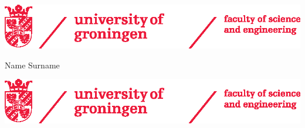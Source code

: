 
\thispagestyle{empty}

\noindent
\includegraphics[width=1\textwidth]{figs/rugr_fse_logoen_rood_cmyk.eps}

\begin{center}

\vspace{6cm}%

{\fontsize{29pt}{34.8pt}\selectfont \textbf{\theprojecttitle}}


\vspace{9cm}%

{\Large Name Surname}

\end{center}

\clearpage


\thispagestyle{empty}

\noindent
\includegraphics[width=1\textwidth]{figs/rugr_fse_logoen_rood_cmyk.eps}

